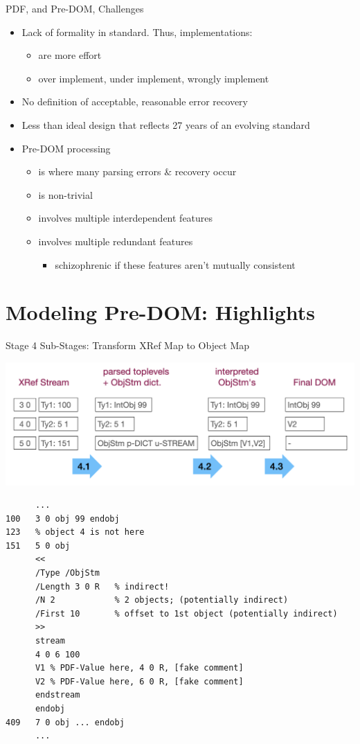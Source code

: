 \documentclass[t,10pt,xcolor={dvipsnames}]{beamer}
\begin{document}
\begin{frame}[label={sec:org87b1799}]{PDF, and Pre-DOM, Challenges}
\begin{itemize}
\item Lack of formality in standard. Thus, implementations:
\begin{itemize}
\item are more effort
\item over implement, under implement, wrongly implement
\end{itemize}
\item No definition of acceptable, reasonable error recovery
\item Less than ideal design that reflects 27 years of an evolving standard
\item Pre-DOM processing
\begin{itemize}
\item is where many parsing errors \& recovery occur
\item is non-trivial
\item involves multiple interdependent features
\item involves multiple redundant features
\begin{itemize}
\item schizophrenic if these features aren't mutually consistent
\end{itemize}
\end{itemize}
\end{itemize}
\end{frame}

\section{Modeling Pre-DOM: Highlights}
\label{sec:orgc7ee4f0}
\begin{frame}[label={sec:orgd87b963},fragile]{Stage 4 Sub-Stages: Transform XRef Map to Object Map}
 \begin{center}
\includegraphics[width=0.8\linewidth]{images/diagram1/cropped-diagram1.001.png}
\end{center}
\begin{verbatim}
      ...
100   3 0 obj 99 endobj
123   % object 4 is not here
151   5 0 obj
      <<
      /Type /ObjStm
      /Length 3 0 R   % indirect!
      /N 2            % 2 objects; (potentially indirect)
      /First 10       % offset to 1st object (potentially indirect)
      >>
      stream
      4 0 6 100
      V1 % PDF-Value here, 4 0 R, [fake comment] 
      V2 % PDF-Value here, 6 0 R, [fake comment]
      endstream
      endobj
409   7 0 obj ... endobj
      ...
\end{verbatim}
\end{frame}
\end{document}
